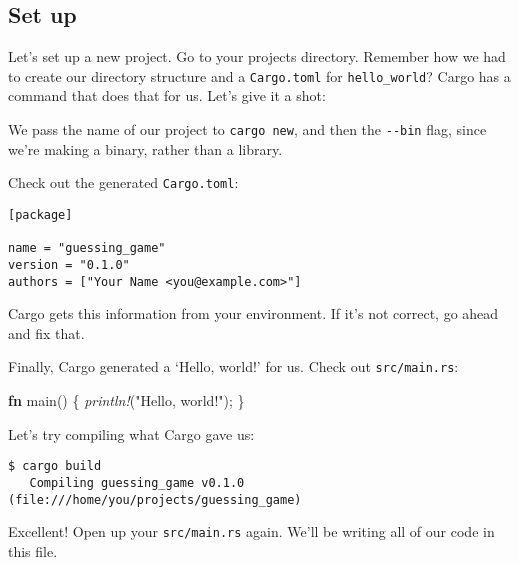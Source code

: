 \documentclass[a4paper,]{book}
\newenvironment{Shaded}{\begin{snugshade}}{\end{snugshade}}
\newcommand{\KeywordTok}[1]{\textcolor[rgb]{0.13,0.29,0.53}{\textbf{{#1}}}}
\newcommand{\StringTok}[1]{\textcolor[rgb]{0.31,0.60,0.02}{{#1}}}
\newcommand{\PreprocessorTok}[1]{\textcolor[rgb]{0.56,0.35,0.01}{\textit{{#1}}}}
\newcommand{\NormalTok}[1]{{#1}}
\begin{document}
\subsection{Set up}\label{set-up}

Let's set up a new project. Go to your projects directory. Remember how
we had to create our directory structure and a \texttt{Cargo.toml} for
\texttt{hello\_world}? Cargo has a command that does that for us. Let's
give it a shot:

\begin{Shaded}
\end{Shaded}

We pass the name of our project to \texttt{cargo\ new}, and then the
\texttt{-\/-bin} flag, since we're making a binary, rather than a
library.

Check out the generated \texttt{Cargo.toml}:

\begin{verbatim}
[package]

name = "guessing_game"
version = "0.1.0"
authors = ["Your Name <you@example.com>"]
\end{verbatim}

Cargo gets this information from your environment. If it's not correct,
go ahead and fix that.

Finally, Cargo generated a `Hello, world!' for us. Check out
\texttt{src/main.rs}:

\begin{Shaded}
\begin{Highlighting}[]
\KeywordTok{fn} \NormalTok{main() \{}
    \PreprocessorTok{println!}\NormalTok{(}\StringTok{"Hello, world!"}\NormalTok{);}
\NormalTok{\}}
\end{Highlighting}
\end{Shaded}

Let's try compiling what Cargo gave us:

\begin{verbatim}
$ cargo build
   Compiling guessing_game v0.1.0 (file:///home/you/projects/guessing_game)
\end{verbatim}

Excellent! Open up your \texttt{src/main.rs} again. We'll be writing all
of our code in this file.
\end{document}

